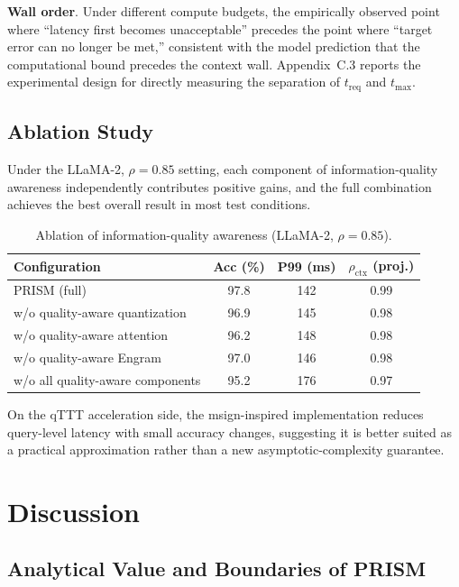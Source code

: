 \documentclass[11pt,a4paper]{article}
\theoremstyle{plain}
\theoremstyle{definition}
\begin{document}
\textbf{Wall order}. Under different compute budgets, the empirically observed point where ``latency first becomes unacceptable'' precedes the point where ``target error can no longer be met,'' consistent with the model prediction that the computational bound precedes the context wall. Appendix~C.3 reports the experimental design for directly measuring the separation of $t_{\text{req}}$ and $t_{\max}$.

\subsection{Ablation Study}

Under the LLaMA-2, $\rho=0.85$ setting, each component of information-quality awareness independently contributes positive gains, and the full combination achieves the best overall result in most test conditions.

\begin{table}[htbp]
\centering
\caption{Ablation of information-quality awareness (LLaMA-2, $\rho=0.85$).}
\label{tab:ablation}
\begin{tabular}{lccc}
\toprule
\textbf{Configuration} & \textbf{Acc (\%)} & \textbf{P99 (ms)} & \textbf{$\rho_{\text{ctx}}$ (proj.)} \\
\midrule
PRISM (full) & 97.8 & 142 & 0.99 \\
w/o quality-aware quantization & 96.9 & 145 & 0.98 \\
w/o quality-aware attention & 96.2 & 148 & 0.98 \\
w/o quality-aware Engram & 97.0 & 146 & 0.98 \\
w/o all quality-aware components & 95.2 & 176 & 0.97 \\
\bottomrule
\end{tabular}
\end{table}

On the qTTT acceleration side, the msign-inspired implementation reduces query-level latency with small accuracy changes, suggesting it is better suited as a practical approximation rather than a new asymptotic-complexity guarantee.

\section{Discussion}

\subsection{Analytical Value and Boundaries of PRISM}
\end{document}
